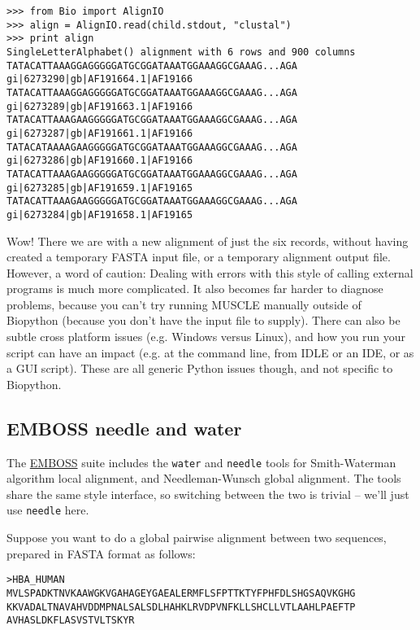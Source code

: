 \documentclass{report}
\begin{document}
\begin{verbatim}
>>> from Bio import AlignIO
>>> align = AlignIO.read(child.stdout, "clustal")
>>> print align
SingleLetterAlphabet() alignment with 6 rows and 900 columns
TATACATTAAAGGAGGGGGATGCGGATAAATGGAAAGGCGAAAG...AGA gi|6273290|gb|AF191664.1|AF19166
TATACATTAAAGGAGGGGGATGCGGATAAATGGAAAGGCGAAAG...AGA gi|6273289|gb|AF191663.1|AF19166
TATACATTAAAGAAGGGGGATGCGGATAAATGGAAAGGCGAAAG...AGA gi|6273287|gb|AF191661.1|AF19166
TATACATAAAAGAAGGGGGATGCGGATAAATGGAAAGGCGAAAG...AGA gi|6273286|gb|AF191660.1|AF19166
TATACATTAAAGAAGGGGGATGCGGATAAATGGAAAGGCGAAAG...AGA gi|6273285|gb|AF191659.1|AF19165
TATACATTAAAGAAGGGGGATGCGGATAAATGGAAAGGCGAAAG...AGA gi|6273284|gb|AF191658.1|AF19165
\end{verbatim}

Wow! There we are with a new alignment of just the six records, without having created
a temporary FASTA input file, or a temporary alignment output file. However, a word of
caution: Dealing with errors with this style of calling external programs is much more
complicated.
It also becomes far harder to diagnose problems, because you can't try running MUSCLE
manually outside of Biopython (because you don't have the input file to supply).
There can also be subtle cross platform issues (e.g. Windows versus Linux), and how
you run your script can have an impact (e.g. at the command line, from IDLE or an
IDE, or as a GUI script). These are all generic Python issues though, and not
specific to Biopython.

\subsection{EMBOSS needle and water}
\label{seq:emboss-needle-water}
The \href{http://emboss.sourceforge.net/}{EMBOSS} suite includes the \texttt{water} and
\texttt{needle} tools for Smith-Waterman algorithm local alignment, and Needleman-Wunsch
global alignment. The tools share the same style interface, so switching between the two
is trivial -- we'll just use \texttt{needle} here.

Suppose you want to do a global pairwise alignment between two sequences, prepared in
FASTA format as follows:

\begin{verbatim}
>HBA_HUMAN
MVLSPADKTNVKAAWGKVGAHAGEYGAEALERMFLSFPTTKTYFPHFDLSHGSAQVKGHG
KKVADALTNAVAHVDDMPNALSALSDLHAHKLRVDPVNFKLLSHCLLVTLAAHLPAEFTP
AVHASLDKFLASVSTVLTSKYR
\end{verbatim}
\end{document}
